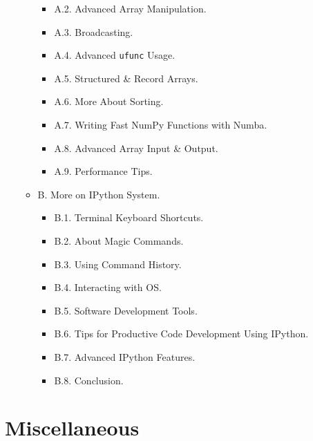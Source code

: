 \documentclass{article}
\begin{document}
\begin{enumerate}
\begin{itemize}
\begin{itemize}
			\item {\sf A.2. Advanced Array Manipulation.}
			\item {\sf A.3. Broadcasting.}
			\item {\sf A.4. Advanced {\tt ufunc} Usage.}
			\item {\sf A.5. Structured \& Record Arrays.}
			\item {\sf A.6. More About Sorting.}
			\item {\sf A.7. Writing Fast NumPy Functions with Numba.}
			\item {\sf A.8. Advanced Array Input \& Output.}
			\item {\sf A.9. Performance Tips.}
		\end{itemize}
		\item {\sf B. More on IPython System.}
		\begin{itemize}
			\item {\sf B.1. Terminal Keyboard Shortcuts.}
			\item {\sf B.2. About Magic Commands.}
			\item {\sf B.3. Using Command History.}
			\item {\sf B.4. Interacting with OS.}
			\item {\sf B.5. Software Development Tools.}
			\item {\sf B.6. Tips for Productive Code Development Using IPython.}
			\item {\sf B.7. Advanced IPython Features.}
			\item {\sf B.8. Conclusion.}
		\end{itemize}
	\end{itemize}	
\end{enumerate}


\section{Miscellaneous}


\printbibliography[heading=bibintoc]
	
\end{document}
